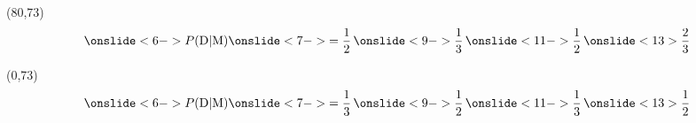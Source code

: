 \documentclass[shownotes,aspectratio=169]{beamer}
\begin{document}
\begin{frame}
{}



\begin{textblock}{80}(80,73) \centering
 \begin{equation*}
 \onslide<6->{ P(\text{D}|\text{M}) }  \onslide<7->{= \frac{1}{2}} \, \onslide<9->{\frac{1}{3}} \, \onslide<11->{\frac{1}{2}} \, \onslide<13>{\frac{2}{3}}
 \end{equation*}
\end{textblock}
\begin{textblock}{80}(0,73) \centering
\begin{equation*}
 \onslide<6->{ P(\text{D}|\text{M})}  \onslide<7->{= \frac{1}{3}} \, \onslide<9->{\frac{1}{2}} \, \onslide<11->{\frac{1}{3}} \, \onslide<13>{\frac{1}{2}}
 \end{equation*}
\end{textblock}



\end{frame}
\end{document}
